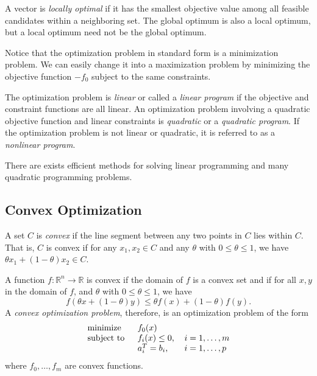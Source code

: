 A vector is \textit{locally optimal} if it has the smallest objective value among all feasible candidates within a neighboring set. The global optimum is also a local optimum, but a local optimum need not be the global optimum.

Notice that the optimization problem in standard form is a minimization problem.  We can easily change it into a maximization problem by minimizing the objective function $-f_0$ subject to the same constraints.

The optimization problem is \textit{linear} or called a \textit{linear program} if the objective and constraint functions are all linear. An optimization problem involving a quadratic objective function and linear constraints is \textit{quadratic} or a \textit{quadratic program}. If the optimization problem is not linear or quadratic, it is referred to as a \textit{nonlinear program}.

There are exists efficient methods for solving linear programming and many quadratic programming problems.

\subsection{Convex Optimization}

A set $C$ is \textit{convex} if the line segment between any two points in $C$ lies within $C$. That is, $C$ is convex if for any $x_1,x_2\in C$ and any $\theta$ with $0\leq\theta\leq 1$, we have $\theta x_1+(1-\theta)x_2\in C$.

A function $f : \mathbb{R}^n\rightarrow\mathbb{R}$ is convex if the domain of $f$ is a convex set and if for all $x,y$ in the domain of $f$, and $\theta$ with $0\leq\theta\leq 1$, we have
\begin{equation}
	f\left(\theta x+\left(1-\theta\right)y\right)\leq\theta f(x)+(1-\theta)f(y).
	\label{eqn:Convexity}
\end{equation}
A \textit{convex optimization problem}, therefore, is an optimization problem of the form
\begin{equation}
	\begin{tabular}{lll}
		\text{minimize }   & $f_0(x)$        &                 \\
		\text{subject to } & $f_i(x)\leq 0$, & $i=1,\ldots, m$ \\
		& $a_i^T = b_i$,  & $i=1,\ldots, p$ 
	\end{tabular}\label{ConvexOptimization}
\end{equation}
where $f_0,\ldots,f_m$ are convex functions.

